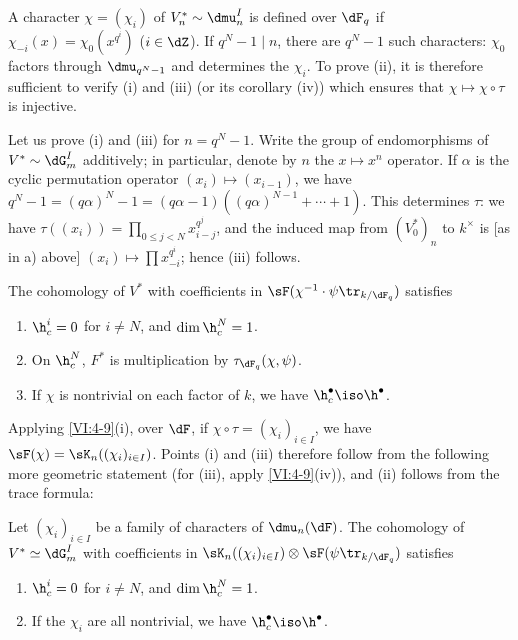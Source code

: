\documentclass[oneside]{book}
\begin{document}
A character $\chi=(\chi_i)$ of $V_n^\ast\sim \dmu_n^I$ is defined over 
$\dF_q$ if $\chi_{-i}(x) =\chi_0(x^{q^i})$ ($i\in \dZ$). If $q^N-1\mid n$, there are 
$q^N-1$ such characters: $\chi_0$ factors through $\dmu_{q^N-1}$ and 
determines the $\chi_i$. To prove (ii), it is therefore sufficient to verify (i) 
and (iii) (or its corollary (iv)) which ensures that $\chi\mapsto \chi\circ \tau$ 
is injective. 

Let us prove (i) and (iii) for $n=q^N-1$. Write the group of 
endomorphisms of $V^\ast\sim \dG_m^I$ additively; in particular, denote by $n$ 
the $x\mapsto x^n$ operator. If $\alpha$ is the cyclic permutation operator 
$(x_i)\mapsto (x_{i-1})$, we have 
$q^N-1=(q\alpha)^N-1 = (q\alpha-1)((q\alpha)^{N-1}+\cdots + 1)$. This 
determines $\tau$: we have $\tau((x_i)) = \prod_{0\leqslant j<N} x_{i-j}^{q^j}$, 
and the induced map from $(V_0^\ast)_n$ to $k^\times$ is [as in a) above] 
$(x_i)\mapsto \prod x_{-i}^{q^i}$; hence (iii) follows. 





\begin{proposition_}\label{VI:4-10}
The cohomology of $V^\ast$ with coefficients in 
$\sF(\chi^{-1}\cdot \psi\tr_{k/\dF_q})$ satisfies 
\begin{enumerate}[\indent (i)]
  \item $\h_c^i = 0$ for $i\ne N$, and $\dim \h_c^N=1$. 
  \item On $\h_c^N$, $F^\ast$ is multiplication by 
    $\tau_{\dF_q}(\chi,\psi)$. 
  \item If $\chi$ is nontrivial on each factor of $k$, we have 
    $\h_c^\bullet \iso \h^\bullet$. 
\end{enumerate}
\end{proposition_}

Applying \ref{VI:4-9}(i), over $\dF$, if $\chi\circ \tau=(\chi_i)_{i\in I}$, 
we have $\sF(\chi) = \sK_n((\chi_i)_{i\in I})$. Points (i) and (iii) 
therefore follow from the following more geometric statement (for (iii), 
apply \ref{VI:4-9}(iv)), and (ii) follows from the trace formula: 





\begin{proposition_}\label{VI:4-11}
Let $(\chi_i)_{i\in I}$ be a family of characters of $\dmu_n(\dF)$. The 
cohomology of $V^\ast\simeq \dG_m^I$ with coefficients in 
$\sK_n((\chi_i)_{i\in I})\otimes \sF(\psi\tr_{k/\dF_q})$ satisfies 
\begin{enumerate}[\indent (i)]
  \item $\h_c^i{}=0$ for $i\ne N$, and $\dim \h_c^N{} = 1$. 
  \item If the $\chi_i$ are all nontrivial, we have 
    $\h_c^\bullet{}\iso \h^\bullet$. 
\end{enumerate}
\end{proposition_}
\end{document}

